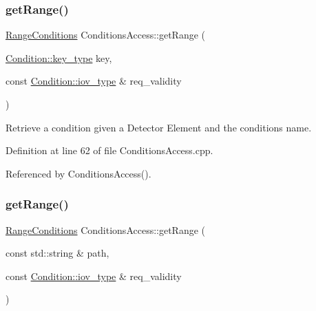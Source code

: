 \subsubsection{\texorpdfstring{get\+Range()}{getRange()}\hspace{0.1cm}{\footnotesize\ttfamily [1/2]}}
{\footnotesize\ttfamily \hyperlink{namespace_d_d4hep_1_1_conditions_ae765f0140a33973a430280f02b6062f4}{Range\+Conditions} Conditions\+Access\+::get\+Range (\begin{DoxyParamCaption}\item[{\hyperlink{class_d_d4hep_1_1_conditions_1_1_condition_a7528efa762e8cc072ef80ea67c3531f9}{Condition\+::key\+\_\+type}}]{key,  }\item[{const \hyperlink{class_d_d4hep_1_1_conditions_1_1_condition_ad84300e226b2085ec5e9db7f47be5539}{Condition\+::iov\+\_\+type} \&}]{req\+\_\+validity }\end{DoxyParamCaption})}



Retrieve a condition given a Detector Element and the conditions name. 



Definition at line 62 of file Conditions\+Access.\+cpp.



Referenced by Conditions\+Access().

\hypertarget{class_d_d4hep_1_1_conditions_1_1_conditions_access_a67b7e2ddb0c713445cb34d4217782bce}{}\label{class_d_d4hep_1_1_conditions_1_1_conditions_access_a67b7e2ddb0c713445cb34d4217782bce} 
\subsubsection{\texorpdfstring{get\+Range()}{getRange()}\hspace{0.1cm}{\footnotesize\ttfamily [2/2]}}
{\footnotesize\ttfamily \hyperlink{namespace_d_d4hep_1_1_conditions_ae765f0140a33973a430280f02b6062f4}{Range\+Conditions} Conditions\+Access\+::get\+Range (\begin{DoxyParamCaption}\item[{const std\+::string \&}]{path,  }\item[{const \hyperlink{class_d_d4hep_1_1_conditions_1_1_condition_ad84300e226b2085ec5e9db7f47be5539}{Condition\+::iov\+\_\+type} \&}]{req\+\_\+validity }\end{DoxyParamCaption})}



